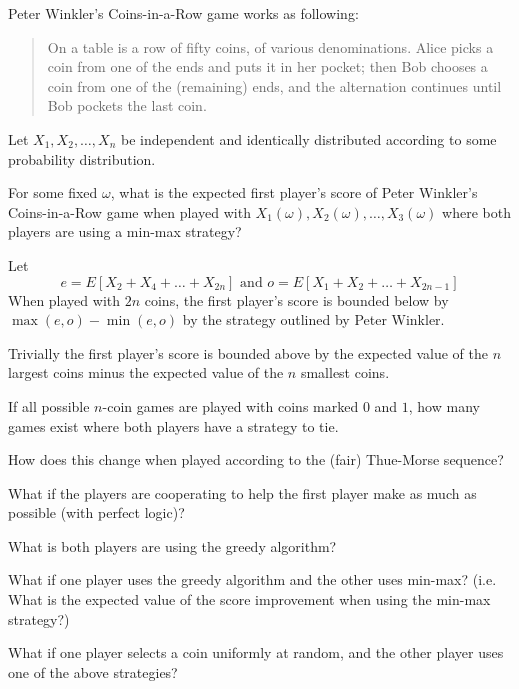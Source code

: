 \documentclass{article}
\begin{document}
Peter Winkler's Coins-in-a-Row game works as following:
\begin{quote}
  On a table is a row of fifty coins, of various denominations.
  Alice picks a coin from one of the ends and puts it in her pocket;
  then Bob chooses a coin from one of the (remaining) ends,
  and the alternation continues until Bob pockets the last coin.
\end{quote}

Let $X_1, X_2, \hdots, X_n$ be independent and identically distributed
according to some probability distribution.

\begin{question}
  For some fixed $\omega$, what is
  the expected first player's score of Peter Winkler's Coins-in-a-Row game when
  played with $X_1(\omega), X_2(\omega), \hdots, X_3(\omega)$ where both players
  are using a min-max strategy?
\end{question}

\begin{note}
  Let \[
    e = E[X_2 + X_4 + \hdots + X_{2n}] \text{ and }
    o = E[X_1 + X_2 + \hdots + X_{2n - 1}]
  \]
  When played with $2n$ coins, the first player's score is bounded below by $
    \max(e, o) - \min(e, o)
  $ by the strategy outlined by Peter Winkler.

  Trivially the first player's score is bounded above by the expected value of
  the $n$ largest coins minus the expected value of the $n$ smallest coins.
\end{note}

\begin{related}
  \item If all possible $n$-coin games are played with coins marked $0$ and $1$,
    how many games exist where both players have a strategy to tie.
  \item How does this change when played according to the (fair) Thue-Morse sequence?
  \item What if the players are cooperating to help the first player make as
    much as possible (with perfect logic)?
  \item What is both players are using the greedy algorithm?
  \item What if one player uses the greedy algorithm and the other uses min-max?
    (i.e. What is the expected value of the score improvement when using the
    min-max strategy?)
  \item What if one player selects a coin uniformly at random, and the other
    player uses one of the above strategies?
\end{related}
\end{document}
